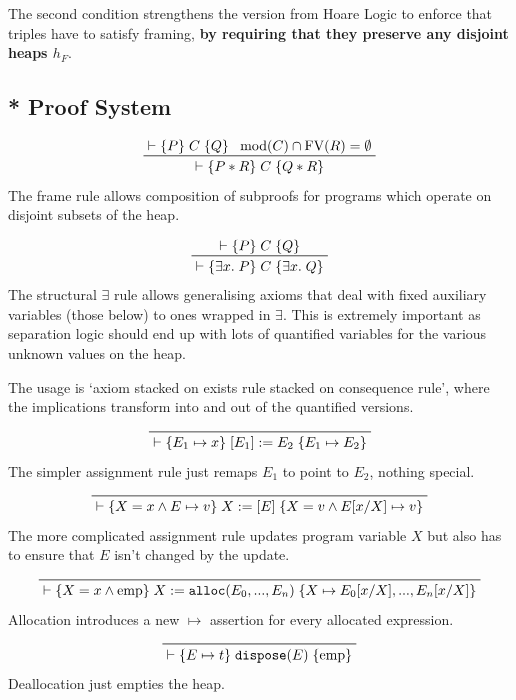 \documentclass[a4paper, 11pt]{article}
\newcommand{\triple}[3]{\{#1\}\;#2\;\{#3\}}
\begin{document}
{    The second condition strengthens the version from Hoare Logic to enforce that triples have to satisfy framing, \textbf{by requiring that they preserve any disjoint heaps \(h_F\)}.

    \subsection*{* Proof System}
    {
        \parskip 0pt
        \begin{adjustwidth}{2cm}{2cm}
        \centering
        \[
        \prftree[r]{}
        {\vdash\triple{P}{C}{Q}}
        {\text{mod}(C) \cap \text{FV}(R) = \emptyset}
        {\vdash\triple{P*R}{C}{Q*R}}
        \]
        The frame rule allows composition of subproofs for programs which operate on disjoint subsets of the heap.
        \end{adjustwidth}
        \begin{adjustwidth}{2cm}{2cm}
        \centering
        \[
        \prftree[r]{}
        {\vdash\triple{P}{C}{Q}}
        {\vdash\triple{\exists x.\;P}{C}{\exists x.\;Q}}
        \]
        The structural \(\exists\) rule allows generalising axioms that deal with fixed auxiliary variables (those below) to ones wrapped in \(\exists\). This is extremely important as separation logic should end up with lots of quantified variables for the various unknown values on the heap.

        The usage is `axiom stacked on exists rule stacked on consequence rule', where the implications transform into and out of the quantified versions.
        \end{adjustwidth}
        \begin{adjustwidth}{2cm}{2cm}
        \centering
        \[
        \prftree[r]{}
        {\vdash\triple{E_1 \mapsto x}{[E_1] := E_2}{E_1 \mapsto E_2}}
        \]
        The simpler assignment rule just remaps \(E_1\) to point to \(E_2\), nothing special.
        \end{adjustwidth}
        \begin{adjustwidth}{2cm}{2cm}
        \centering
        \[
        \prftree[r]{}
        {\vdash\triple{X = x \wedge E \mapsto v}{X := [E]}{X = v \wedge E[x/X] \mapsto v}}
        \]
        The more complicated assignment rule updates program variable \(X\) but also has to ensure that \(E\) isn't changed by the update.
        \end{adjustwidth}
        \begin{adjustwidth}{2cm}{2cm}
        \centering
        \[
        \prftree[r]{}
        {\vdash\triple{X = x \wedge \text{emp}}{X := \texttt{alloc}(E_0,...,E_n)}{X \mapsto E_0[x/X], ..., E_n[x/X]}}
        \]
        Allocation introduces a new \(\mapsto\) assertion for every allocated expression.
        \end{adjustwidth}
        \begin{adjustwidth}{2cm}{2cm}
        \centering
        \[
        \prftree[r]{}
        {\vdash\triple{E \mapsto t}{\texttt{dispose}(E)}{\text{emp}}}
        \]
        Deallocation just empties the heap.
        \end{adjustwidth}
    }
}
\end{document}
